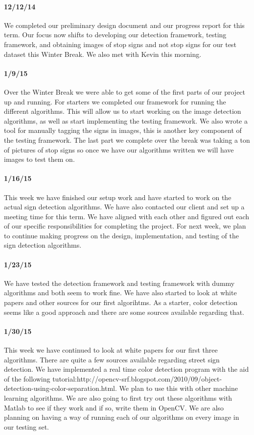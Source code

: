 \documentclass[letterpaper,10pt,titlepage]{article}
\begin{document}
    \paragraph*{12/12/14}
    We completed our preliminary design document and our progress report for
    this term. Our focus now shifts to developing our detection framework, 
    testing framework, and obtaining images of stop signs and not stop signs 
    for our test dataset this Winter Break. We also met with Kevin this 
    morning.
    \paragraph*{1/9/15}
    Over the Winter Break we were able to get some of the first parts of our
    project up and running. For starters we completed our framework for 
    running the different algorithms. This will allow us to start working on 
    the image detection algorithms, as well as start implementing the testing
    framework. We also wrote a tool for manually tagging the signs in images,
    this is another key component of the testing framework. The last part we 
    complete over the break was taking a ton of pictures of stop signs so once
    we have our algorithms written we will have images to test them on. 
    \paragraph*{1/16/15}
    This week we have finished our setup work and have started to work on the
    actual sign detection algorithms. We have also contacted our client and set
    up a meeting time for this term. We have aligned with each other and 
    figured out each of our specific responsibilities for completing the 
    project. For next week, we plan to continue making progress on the design,
    implementation, and testing of the sign detection algorithms. 
    \paragraph*{1/23/15}
    We have tested the detection framework and testing framework with dummy
    algorithms and both seem to work fine. We have also started to look at 
    white papers and other sources for our first algorihtms. As a starter, 
    color detection seems like a good approach and there are some sources 
    available regarding that.
    \paragraph*{1/30/15}
    This week we have continued to look at white papers for our first three 
    algorithms. There are quite a few sources available regarding street sign
    detection. We have implemented a real time color detection program with 
    the aid of the following tutorial:http://opencv-srf.blogspot.com/2010/09/object-detection-using-color-separation.html.
    We plan to use this with other machine learning algorithms. We are also 
    going to first try out these algorithms with Matlab to see if they work and
    if so, write them in OpenCV. We are also planning on having a way of 
    running each of our algorithms on every image in our testing set. 
\end{document}
